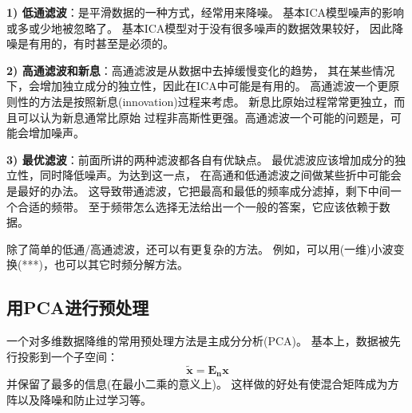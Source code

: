 \textbf{1) 低通滤波}：是平滑数据的一种方式，经常用来降噪。
基本ICA模型噪声的影响或多或少地被忽略了。
基本ICA模型对于没有很多噪声的数据效果较好，
因此降噪是有用的，有时甚至是必须的。

\textbf{2) 高通滤波和新息}：高通滤波是从数据中去掉缓慢变化的趋势，
其在某些情况下，会增加独立成分的独立性，因此在ICA中可能是有用的。
高通滤波一个更原则性的方法是按照新息(innovation)过程来考虑。
新息比原始过程常常更独立，而且可以认为新息通常比原始
过程非高斯性更强。高通滤波一个可能的问题是，可能会增加噪声。

\textbf{3) 最优滤波}：前面所讲的两种滤波都各自有优缺点。
最优滤波应该增加成分的独立性，同时降低噪声。为达到这一点，
在高通和低通滤波之间做某些折中可能会是最好的办法。
这导致带通滤波，它把最高和最低的频率成分滤掉，剩下中间一个合适的频带。
至于频带怎么选择无法给出一个一般的答案，它应该依赖于数据。
 
除了简单的低通/高通滤波，还可以有更复杂的方法。
例如，可以用(一维)小波变换(***)，也可以其它时频分解方法。
    
\subsection{用PCA进行预处理}
一个对多维数据降维的常用预处理方法是主成分分析(PCA)。
基本上，数据被先行投影到一个子空间：
\begin{equation}
\bm{\tilde{x}=E_n x}
\end{equation}
并保留了最多的信息(在最小二乘的意义上)。
这样做的好处有使混合矩阵成为方阵以及降噪和防止过学习等。
